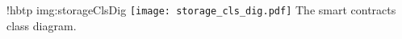 \namedfigure
{!hbtp}
{img:storageClsDig}
{\texttt{[image: storage\_cls\_dig.pdf]}}
{The smart contracts class diagram.}
